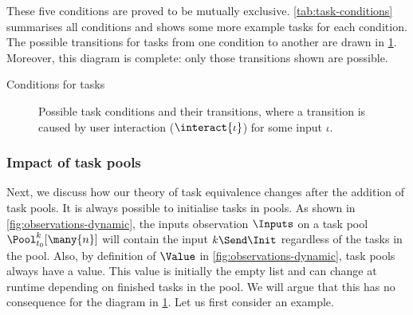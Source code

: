 These five conditions are proved to be mutually exclusive.
\cref{tab:task-conditions} summarises all conditions
and shows some more example tasks for each condition.
The possible transitions for tasks from one condition to another are drawn in \cref{fig:task-conditions}.
Moreover, this diagram is complete:
only those transitions shown are possible.

\begin{table}
  
  \caption{Conditions for tasks}
  \label{tab:task-conditions}
\end{table}

\begin{figure}
  
  \caption{Possible task conditions and their transitions, where a transition is caused by user interaction ($\interact{\iota}$) for some input $\iota$.}
  \label{fig:task-conditions}
\end{figure}


\subsubsection{Impact of task pools}

Next, we discuss how our theory of task equivalence changes after the addition of task pools.
It is always possible to initialise tasks in pools.
As shown in \cref{fig:observations-dynamic},
the inputs observation $\Inputs$ on a task pool $\Pool_{t_0}^k [\many{n}]$ will contain the input $k\Send\Init$
regardless of the tasks in the pool.
Also, by definition of $\Value$ in \cref{fig:observations-dynamic},
task pools always have a value.
This value is initially the empty list
and can change at runtime depending on finished tasks in the pool.
We will argue that this has no consequence for the diagram in \cref{fig:task-conditions}.
Let us first consider an example.

